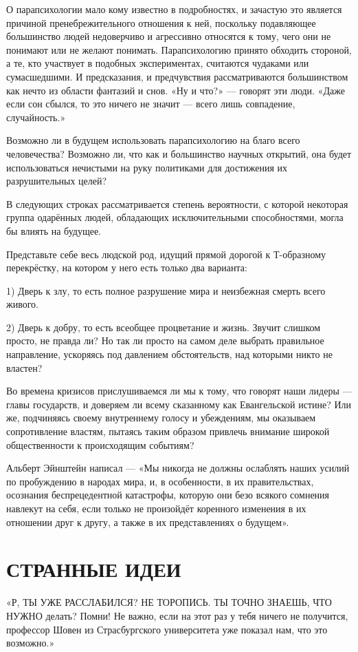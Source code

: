 \documentclass[a5paper, 9pt,
final, openany, twoside=true]{memoir}
\begin{document}
О парапсихологии мало кому известно в подробностях, и зачастую это является причиной пренебрежительного отношения к ней, поскольку подавляющее большинство людей недоверчиво и агрессивно относятся к тому, чего они не понимают или не желают понимать. Парапсихологию принято обходить стороной, а те, кто участвует в подобных экспериментах, считаются чудаками или сумасшедшими. И предсказания, и предчувствия рассматриваются большинством как нечто из области фантазий и снов. «Ну и что?» — говорят эти люди. «Даже если сон сбылся, то это ничего не значит — всего лишь совпадение, случайность.»\bigskip

Возможно ли в будущем использовать парапсихологию на благо всего человечества? Возможно ли, что как и большинство научных открытий, она будет использоваться нечистыми на руку политиками для достижения их разрушительных целей?\bigskip

В следующих строках рассматривается степень вероятности, с которой некоторая группа одарённых людей, обладающих исключительными способностями, могла бы влиять на будущее.\bigskip

Представьте себе весь людской род, идущий прямой дорогой к Т-образному перекрёстку, на котором у него есть только два варианта:\bigskip

1) Дверь к злу, то есть полное разрушение мира и неизбежная смерть всего живого.\bigskip

2) Дверь к добру, то есть всеобщее процветание и жизнь.
Звучит слишком просто, не правда ли? Но так ли просто на самом деле выбрать правильное направление, ускоряясь под давлением обстоятельств, над которыми никто не властен?\bigskip

Во времена кризисов прислушиваемся ли мы к тому, что говорят наши лидеры — главы государств, и доверяем ли всему сказанному как Евангельской истине? Или же, подчиняясь своему внутреннему голосу и убеждениям, мы оказываем сопротивление властям, пытаясь таким образом привлечь внимание широкой общественности к происходящим событиям?\bigskip

Альберт Эйнштейн написал — «Мы никогда не должны ослаблять наших усилий по пробуждению в народах мира, и, в особенности, в их правительствах, осознания беспрецедентной катастрофы, которую они безо всякого сомнения навлекут на себя, если только не произойдёт коренного изменения в их отношении друг к другу, а также в их представлениях о будущем».\bigskip
\chapter{СТРАННЫЕ ИДЕИ}
«Р{, ТЫ УЖЕ РАССЛАБИЛСЯ? НЕ ТОРОПИСЬ. ТЫ ТОЧНО ЗНАЕШЬ, ЧТО НУЖНО} делать? Помни! Не важно, если на этот раз у тебя ничего не получится, профессор Шовен из Страсбургского университета уже показал нам, что это возможно.»
\end{document}
